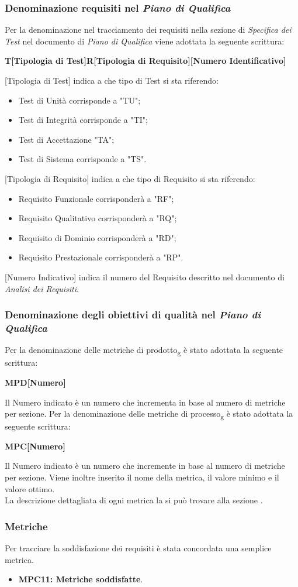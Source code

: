 \subsubsection{Denominazione requisiti nel \textit{Piano di Qualifica}}
 Per la denominazione nel tracciamento dei requisiti nella sezione di \textit{Specifica dei Test} nel documento di \textit{Piano di Qualifica} viene adottata la seguente scrittura:
 \begin{center}\textbf{T[Tipologia di Test]R[Tipologia di Requisito][Numero Identificativo]}\end{center}
 [Tipologia di Test] indica a che tipo di Test si sta riferendo:
 \begin{itemize}
 \item Test di Unità corrisponde a "TU";
 \item Test di Integrità corrisponde a "TI";
 \item Test di Accettazione "TA";
 \item Test di Sistema corrisponde a "TS".
 \end{itemize}
 [Tipologia di Requisito] indica a che tipo di Requisito si sta riferendo:
 \begin{itemize}
 \item Requisito Funzionale corrisponderà a "RF";
 \item Requisito Qualitativo corrisponderà a "RQ";
 \item Requisito di Dominio corrisponderà a "RD";
 \item Requisito Prestazionale corrisponderà a "RP".
 \end{itemize}
 [Numero Indicativo] indica il numero del Requisito descritto nel documento di \textit{Analisi dei Requisiti}.
 
\subsubsection{Denominazione degli obiettivi di qualità nel \textit{Piano di Qualifica}}
Per la denominazione delle metriche di prodotto\textsubscript{g} è stato adottata la seguente scrittura:
\begin{center}\textbf{MPD[Numero]}\end{center}
Il Numero indicato è un numero che incrementa in base al numero di metriche per sezione.
Per la denominazione delle metriche di processo\textsubscript{g} è stato adottata la seguente scrittura:
\begin{center}\textbf{MPC[Numero]}\end{center}
Il Numero indicato è un numero che incremente in base al numero di metriche per sezione.
Viene inoltre inserito il nome della metrica, il valore minimo e il valore ottimo.\\
La descrizione dettagliata di ogni metrica la si può trovare alla sezione .
\subsubsection{Metriche} 
Per tracciare la soddisfazione dei requisiti è stata concordata una semplice metrica.
\begin{itemize}
    \item \textbf{MPC11: Metriche soddisfatte}.
\end{itemize}
